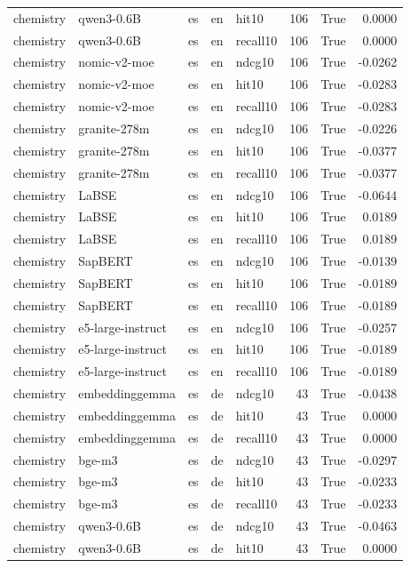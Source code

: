 \begin{tabular}{lllllrrr}
chemistry & qwen3-0.6B & es & en & hit10 & 106 & True & 0.0000 \\
chemistry & qwen3-0.6B & es & en & recall10 & 106 & True & 0.0000 \\
chemistry & nomic-v2-moe & es & en & ndcg10 & 106 & True & -0.0262 \\
chemistry & nomic-v2-moe & es & en & hit10 & 106 & True & -0.0283 \\
chemistry & nomic-v2-moe & es & en & recall10 & 106 & True & -0.0283 \\
chemistry & granite-278m & es & en & ndcg10 & 106 & True & -0.0226 \\
chemistry & granite-278m & es & en & hit10 & 106 & True & -0.0377 \\
chemistry & granite-278m & es & en & recall10 & 106 & True & -0.0377 \\
chemistry & LaBSE & es & en & ndcg10 & 106 & True & -0.0644 \\
chemistry & LaBSE & es & en & hit10 & 106 & True & 0.0189 \\
chemistry & LaBSE & es & en & recall10 & 106 & True & 0.0189 \\
chemistry & SapBERT & es & en & ndcg10 & 106 & True & -0.0139 \\
chemistry & SapBERT & es & en & hit10 & 106 & True & -0.0189 \\
chemistry & SapBERT & es & en & recall10 & 106 & True & -0.0189 \\
chemistry & e5-large-instruct & es & en & ndcg10 & 106 & True & -0.0257 \\
chemistry & e5-large-instruct & es & en & hit10 & 106 & True & -0.0189 \\
chemistry & e5-large-instruct & es & en & recall10 & 106 & True & -0.0189 \\
chemistry & embeddinggemma & es & de & ndcg10 & 43 & True & -0.0438 \\
chemistry & embeddinggemma & es & de & hit10 & 43 & True & 0.0000 \\
chemistry & embeddinggemma & es & de & recall10 & 43 & True & 0.0000 \\
chemistry & bge-m3 & es & de & ndcg10 & 43 & True & -0.0297 \\
chemistry & bge-m3 & es & de & hit10 & 43 & True & -0.0233 \\
chemistry & bge-m3 & es & de & recall10 & 43 & True & -0.0233 \\
chemistry & qwen3-0.6B & es & de & ndcg10 & 43 & True & -0.0463 \\
chemistry & qwen3-0.6B & es & de & hit10 & 43 & True & 0.0000 \\

\end{tabular}
